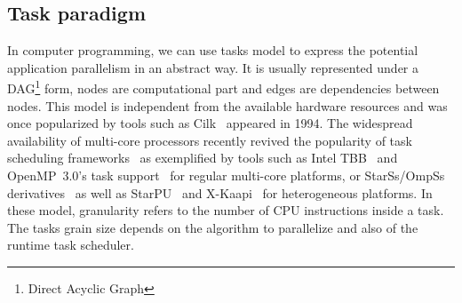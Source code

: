 \subsection{Task paradigm}
In computer programming, we can use tasks model to express the potential application parallelism in an abstract way.
%
It is usually represented under a DAG\footnote{Direct Acyclic Graph} form, nodes are computational part and edges are dependencies between nodes.
%
This model is independent from the available hardware resources and was once popularized by tools such as Cilk~\cite{Cilk} appeared in 1994.
%
The widespread availability of multi-core processors recently revived the popularity of task scheduling frameworks~\cite{taskscomparison} as exemplified by tools such as Intel TBB~\cite{Intel::TBB} and OpenMP~3.0's task support~\cite{openmptasks} for regular multi-core platforms, or StarSs/OmpSs derivatives~\cite{OMPSs} as well as StarPU~\cite{starpu} and X-Kaapi~\cite{xkaapi} for heterogeneous platforms.
%
In these model, granularity refers to the number of CPU instructions inside a task.
%
The tasks grain size depends on the algorithm to parallelize and also of the runtime task scheduler.
